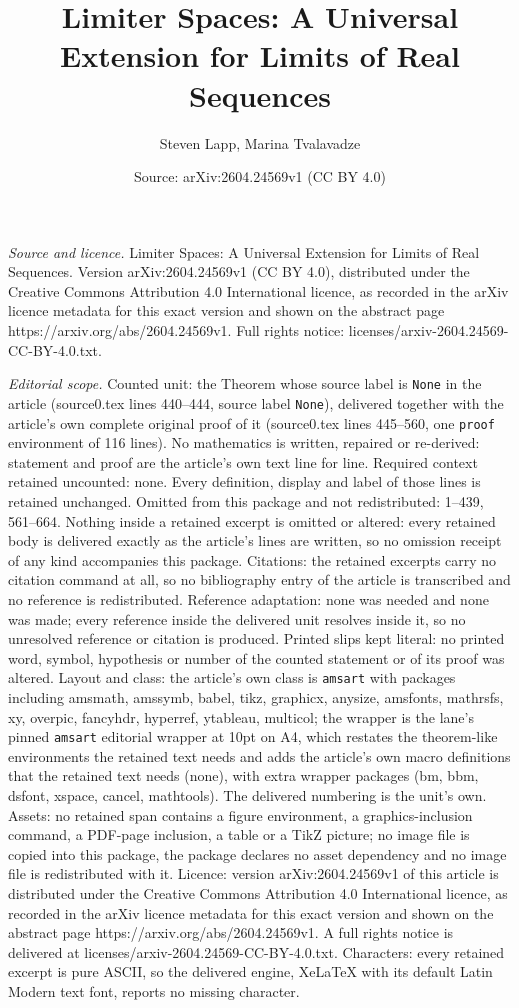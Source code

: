 \documentclass[10pt,a4paper]{amsart}
\title[Limiter Spaces: A Universal Extension for Limits of Real Seq]{Limiter Spaces: A Universal Extension for Limits of Real Sequences}
\author{Steven Lapp, Marina Tvalavadze}
\date{Source: arXiv:2604.24569v1 (CC BY 4.0)}
\begin{document}
\maketitle

\noindent\emph{Source and licence.} Limiter Spaces: A Universal Extension for Limits of Real Sequences. Version arXiv:2604.24569v1 (CC BY 4.0), distributed under the Creative Commons Attribution 4.0 International licence, as recorded in the arXiv licence metadata for this exact version and shown on the abstract page https://arxiv.org/abs/2604.24569v1. Full rights notice: licenses/arxiv-2604.24569-CC-BY-4.0.txt.\par\smallskip

\noindent\textit{Editorial scope.} Counted unit: the Theorem whose source label is \texttt{None} in the article (source0.tex lines 440--444, source label \texttt{None}), delivered together with the article's own complete original proof of it (source0.tex lines 445--560, one \texttt{proof} environment of 116 lines). No mathematics is written, repaired or re-derived: statement and proof are the article's own text line for line. Required context retained uncounted: none. Every definition, display and label of those lines is retained unchanged. Omitted from this package and not redistributed: 1--439, 561--664. Nothing inside a retained excerpt is omitted or altered: every retained body is delivered exactly as the article's lines are written, so no omission receipt of any kind accompanies this package. Citations: the retained excerpts carry no citation command at all, so no bibliography entry of the article is transcribed and no reference is redistributed. Reference adaptation: none was needed and none was made; every reference inside the delivered unit resolves inside it, so no unresolved reference or citation is produced. Printed slips kept literal: no printed word, symbol, hypothesis or number of the counted statement or of its proof was altered. Layout and class: the article's own class is \texttt{amsart} with packages including amsmath, amssymb, babel, tikz, graphicx, anysize, amsfonts, mathrsfs, xy, overpic, fancyhdr, hyperref, ytableau, multicol; the wrapper is the lane's pinned \texttt{amsart} editorial wrapper at 10pt on A4, which restates the theorem-like environments the retained text needs and adds the article's own macro definitions that the retained text needs (none), with extra wrapper packages (bm, bbm, dsfont, xspace, cancel, mathtools). The delivered numbering is the unit's own. Assets: no retained span contains a figure environment, a graphics-inclusion command, a PDF-page inclusion, a table or a TikZ picture; no image file is copied into this package, the package declares no asset dependency and no image file is redistributed with it. Licence: version arXiv:2604.24569v1 of this article is distributed under the Creative Commons Attribution 4.0 International licence, as recorded in the arXiv licence metadata for this exact version and shown on the abstract page https://arxiv.org/abs/2604.24569v1. A full rights notice is delivered at licenses/arxiv-2604.24569-CC-BY-4.0.txt. Characters: every retained excerpt is pure ASCII, so the delivered engine, XeLaTeX with its default Latin Modern text font, reports no missing character.
\end{document}
